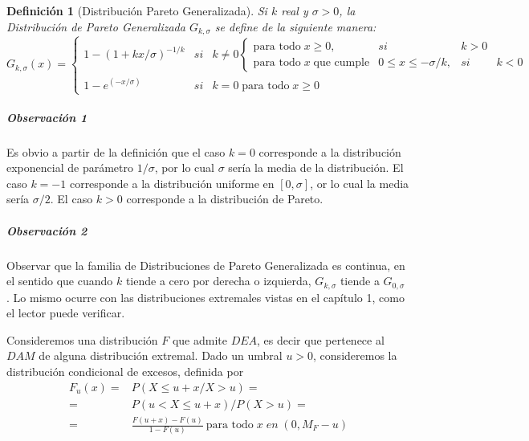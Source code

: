 \documentclass[
  12pt]{article}
\newtheorem{definition}{Definición}[section]
\begin{document}
\begin{definition}[Distribución Pareto Generalizada]
Si $k$ real y $\sigma>0$, la Distribución de Pareto Generalizada $G_{k,\sigma}$ se define de la siguiente manera:\\
\begin{equation}
G_{k,\sigma}(x)=\left\{\begin{matrix}
 1-(1+kx/\sigma)^{-1/k}& si & k\neq 0 \left\{\begin{matrix}
\text{para todo} \;x\geq 0 , & si & k>0\\ 
\text{para todo}\; x \;\text{que cumple}&
0\leq x \leq  -\sigma/k, &si& k<0
\end{matrix}\right.\\ 
 1-e^{(-x/\sigma)} & si& k =0\; \text{para todo}\; x\geq 0
\end{matrix}\right. 
\end{equation}
\end{definition}

\subparagraph{Observación 1}\label{observaciuxf3n-1}

Es obvio a partir de la definición que el caso \(k=0\) corresponde a la
distribución exponencial de parámetro \(1/\sigma\), por lo cual
\(\sigma\) sería la media de la distribución. El caso \(k=-1\)
corresponde a la distribución uniforme en \([0, \sigma]\), or lo cual la
media sería \(\sigma/2\). El caso \(k>0\) corresponde a la distribución
de Pareto.

\subparagraph{Observación 2}\label{observaciuxf3n-2}

Observar que la familia de Distribuciones de Pareto Generalizada es
continua, en el sentido que cuando \(k\) tiende a cero por derecha o
izquierda, \(G_{k,\sigma}\) tiende a \(G_{0,\sigma}\) . Lo mismo ocurre
con las distribuciones extremales vistas en el capítulo 1, como el
lector puede verificar.

\begin{theorem}
Consideremos una distribución $F$ que admite $DEA$, es decir que pertenece al $DAM$ de alguna distribución extremal. Dado un umbral $u>0$, consideremos la distribución condicional de excesos, definida por
\begin{align}
F_u(x)= &P(X \leq  u+x/ X>u)= \nonumber \\
=&P(u<X \leq u+x)/P(X>u)= \nonumber \\
=&\frac{F(u+x)-F(u)}{1-F(u)}\:\text{para todo}\; x\; en\;(0,M_{F}-u)
\end{align}
\end{theorem}
\end{document}
